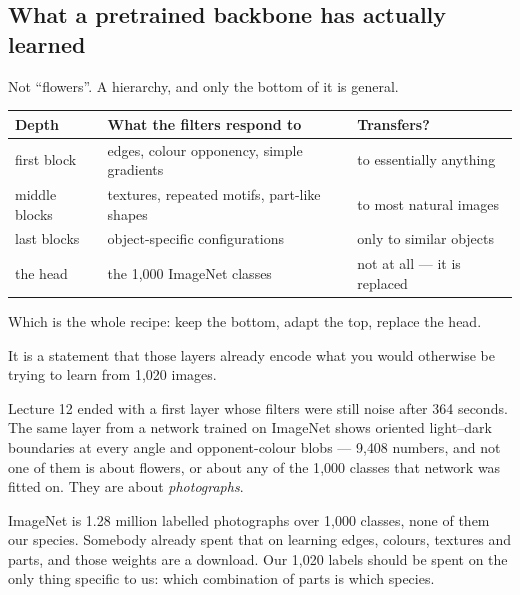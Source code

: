 \documentclass[11pt,a4paper]{article}
\begin{document}
\subsection{What a pretrained backbone has actually learned}

Not ``flowers''. A hierarchy, and only the bottom of it is general.

\begin{center}
\small
\begin{tabular}{lll}
\toprule
\textbf{Depth} & \textbf{What the filters respond to} & \textbf{Transfers?} \\
\midrule
first block & edges, colour opponency, simple gradients & to essentially
                                                          anything \\
middle blocks & textures, repeated motifs, part-like shapes & to most natural
                                                              images \\
last blocks & object-specific configurations & only to similar objects \\
the head & the 1{,}000 ImageNet classes & not at all --- it is replaced \\
\bottomrule
\end{tabular}
\end{center}

Which is the whole recipe: keep the bottom, adapt the top, replace the head.

\begin{keybox}[title={Freezing is not a compromise forced by compute}]
It is a statement that those layers already encode what you would otherwise be
trying to learn from 1{,}020 images.
\end{keybox}

Lecture 12 ended with a first layer whose filters were still noise after 364
seconds. The same layer from a network trained on ImageNet shows oriented
light--dark boundaries at every angle and opponent-colour blobs --- 9{,}408
numbers, and not one of them is about flowers, or about any of the 1{,}000
classes that network was fitted on. They are about \emph{photographs}.

ImageNet is 1.28 million labelled photographs over 1{,}000 classes, none of
them our species. Somebody already spent that on learning edges, colours,
textures and parts, and those weights are a download. Our 1{,}020 labels should
be spent on the only thing specific to us: which combination of parts is which
species.
\end{document}
